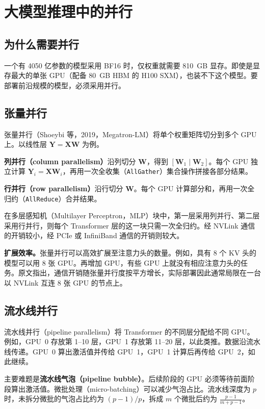 
\chapter{大模型推理中的并行}

\section{为什么需要并行}

一个有 4050 亿参数的模型采用 BF16 时，仅权重就需要 810~GB 显存。即使是显存最大的单张 GPU（配备 80~GB HBM 的 H100 SXM），也装不下这个模型。要部署前沿规模的模型，必须采用并行。

\section{张量并行}

张量并行（Shoeybi 等，2019，Megatron-LM）将单个权重矩阵切分到多个 GPU 上。以线性层 \(\mathbf{Y}=\mathbf{X}\mathbf{W}\) 为例。

\textbf{列并行（column parallelism）}沿列切分 \(\mathbf{W}\)，得到 \([\mathbf{W}_1\mid\mathbf{W}_2]\)。每个 GPU 独立计算 \(\mathbf{Y}_i=\mathbf{X}\mathbf{W}_i\)，再用一次全收集（\texttt{AllGather}）集合操作拼接各部分结果。

\textbf{行并行（row parallelism）}沿行切分 \(\mathbf{W}\)。每个 GPU 计算部分和，再用一次全归约（\texttt{AllReduce}）合并结果。

在多层感知机（Multilayer Perceptron，MLP）块中，第一层采用列并行、第二层采用行并行，则每个 Transformer 层的这一块只需一次全归约。经 NVLink 通信的开销较小，经 PCIe 或 InfiniBand 通信的开销则较大。

\textbf{扩展效率。}张量并行可以高效扩展至注意力头的数量。例如，具有 8 个 KV 头的模型可以用 8 张 GPU。再增加 GPU，有些 GPU 上就没有相应注意力头的任务。原文指出，通信开销随张量并行度按平方增长，实际部署因此通常局限在一台以 NVLink 互连 8 张 GPU 的节点上。

\section{流水线并行}

流水线并行（pipeline parallelism）将 Transformer 的不同层分配给不同 GPU。例如，GPU~0 存放第 1–10 层，GPU~1 存放第 11–20 层，以此类推。数据沿流水线传递。GPU~0 算出激活值并传给 GPU~1，GPU~1 计算后再传给 GPU~2，如此继续。

主要难题是\textbf{流水线气泡（pipeline bubble）}。后续阶段的 GPU 必须等待前面阶段算出激活值。微批处理（micro-batching）可以减少气泡占比。流水线深度为 \(p\) 时，未拆分微批的气泡占比约为 \((p-1)/p\)，拆成 \(m\) 个微批后约为 \(\frac{p-1}{m+p-1}\)。

